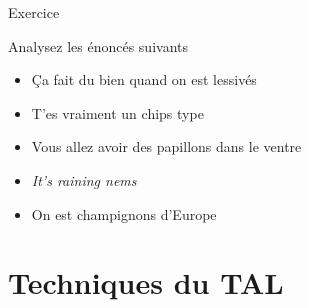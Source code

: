 \documentclass[serif, aspectratio=169]{beamer}
\begin{document}
\begin{exoframe}{Exercice}
    \begin{block}{Analysez les énoncés suivants \hfill {}}
        \begin{itemize} \color{white}
            \item Ça fait du bien quand on est lessivés \hfill {}
            \item T'es vraiment un chips type \hfill {}
            \item Vous allez avoir des papillons dans le ventre \hfill {}
            \item \textit{It's raining nems} \hfill {}
            \item On est champignons d'Europe \hfill {}
        \end{itemize}
    \end{block}
\end{exoframe}

\section{Techniques du TAL}
\end{document}
